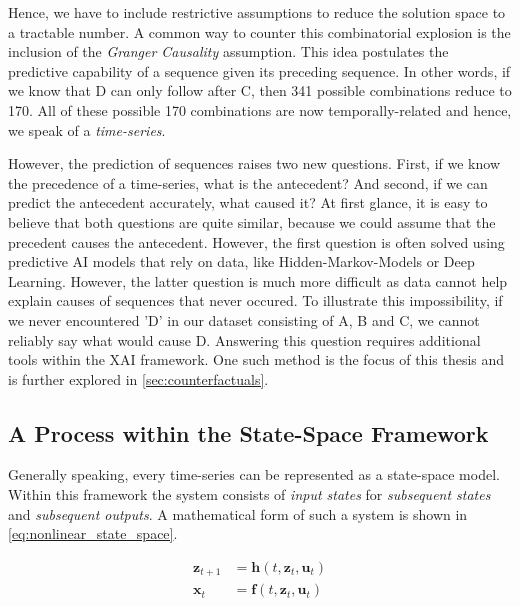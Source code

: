 \documentclass[12pt,a4paper]{report}
\begin{document}
Hence, we have to include restrictive assumptions to reduce the solution space to a tractable number. A common way to counter this combinatorial explosion is the inclusion of the \emph{Granger Causality} assumption. This idea postulates the predictive capability of a sequence given its preceding sequence. In other words, if we know that D can only follow after C, then 341 possible combinations reduce to 170. All of these possible 170 combinations are now temporally-related and hence, we speak of a \emph{time-series}.

However, the prediction of sequences raises two new questions. First, if we know the precedence of a time-series, what is the antecedent? And second, if we can predict the antecedent accurately, what caused it?
At first glance, it is easy to believe that both questions are quite similar, because we could assume that the precedent causes the antecedent. However,
the first question is often solved using predictive AI models that rely on data, like Hidden-Markov-Models or Deep Learning. However, the latter question is much more difficult as data cannot help explain causes of sequences that never occured. To illustrate this impossibility, if we never encountered 'D' in our dataset consisting of A, B and C, we cannot reliably say what would cause D. Answering this question requires additional tools within the \gls{XAI} framework. One such method is the focus of this thesis and is further explored in \autoref{sec:counterfactuals}.

\subsection{A Process within the State-Space Framework}
Generally speaking, every time-series can be represented as a state-space model\autocite{kalman_NewApproachLinear_1960a}. Within this framework the system consists of \emph{input states} for \emph{subsequent states} and \emph{subsequent outputs}. A mathematical form of such a system is shown in \autoref{eq:nonlinear_state_space}.

\begin{align}
    \label{eq:nonlinear_state_space}
    \mathbf{z}_{t+1} & =\mathbf{h}(t, \mathbf{z}_{t}, \mathbf{u}_{t})           \\
    \mathbf{x}_{t}   & =\mathbf{f}(t, \mathbf{z}_{t}, \mathbf{u}_{t}) \nonumber
\end{align}
\end{document}
